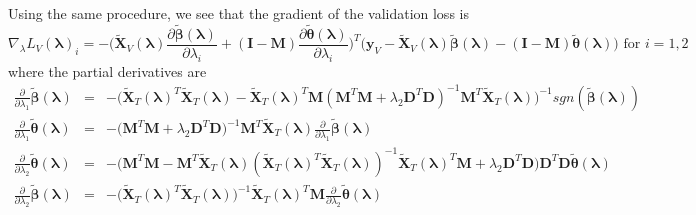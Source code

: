 \documentclass[10pt,letterpaper]{article}
\begin{document}
Using the same procedure, we see that the gradient of the validation loss is
\begin{equation*}
\nabla_\lambda L_V(\boldsymbol{\lambda})_i =
- \bigg(
\tilde{\boldsymbol{X}}_V(\boldsymbol{\lambda}) \frac{\partial \tilde{\boldsymbol\beta}(\boldsymbol{\lambda})}{\partial \lambda_i}
+ (\boldsymbol I - \boldsymbol{M}) \frac{\partial \tilde{\boldsymbol\theta}(\boldsymbol{\lambda})}{\partial \lambda_i}
\bigg )^T
\bigg (
\boldsymbol{y}_V
- \tilde{\boldsymbol{X}}_V(\boldsymbol{\lambda}) \tilde{\boldsymbol\beta}(\boldsymbol{\lambda})
- (\boldsymbol I - \boldsymbol{M}) \tilde{\boldsymbol\theta}(\boldsymbol{\lambda})
\bigg )
\text{ for } i = 1,2 
\end{equation*}
where the partial derivatives are
\begin{equation*}
\begin{array}{lcl}
\frac{\partial}{\partial \lambda_1} \tilde{\boldsymbol\beta}(\boldsymbol{\lambda})  &=&
-\bigg(\tilde{\boldsymbol X}_T(\boldsymbol{\lambda})^T \tilde{\boldsymbol X}_T(\boldsymbol{\lambda})
- \tilde{\boldsymbol X}_T(\boldsymbol{\lambda})^T \boldsymbol{M}(\boldsymbol{M}^T \boldsymbol{M}
+ \lambda_2 \boldsymbol{D}^T\boldsymbol{D})^{-1} \boldsymbol{M}^T \tilde{\boldsymbol X}_T(\boldsymbol{\lambda}) \bigg)^{-1} 
sgn( \tilde{\boldsymbol\beta}(\boldsymbol{\lambda})) \\
\frac{\partial }{\partial \lambda_1} \tilde{\boldsymbol\theta}(\boldsymbol{\lambda}) &=&
-\bigg(\boldsymbol{M}^T \boldsymbol{M}
+ \lambda_2 \boldsymbol{D}^T \boldsymbol{D}\bigg)^{-1}
\boldsymbol{M}^T \tilde{\boldsymbol X}_T(\boldsymbol{\lambda}) \frac{\partial}{\partial \lambda_1} \tilde{\boldsymbol\beta}(\boldsymbol{\lambda})
\\
\frac{\partial}{\partial \lambda_2}  \tilde{\boldsymbol\theta}(\boldsymbol{\lambda}) &=&
-\bigg(\boldsymbol{M}^T \boldsymbol{M}
- \boldsymbol{M}^T \tilde{\boldsymbol X}_T(\boldsymbol{\lambda}) (\tilde{\boldsymbol X}_T(\boldsymbol{\lambda})^T\tilde{\boldsymbol X}_T(\boldsymbol{\lambda}))^{-1} \tilde{\boldsymbol X}_T(\boldsymbol{\lambda})^T \boldsymbol{M} + \lambda_2 \boldsymbol{D}^T\boldsymbol{D} \bigg)
\boldsymbol{D}^T\boldsymbol{D} \tilde{\boldsymbol\theta}(\boldsymbol{\lambda})
\\
\frac{\partial}{\partial \lambda_2} \tilde{\boldsymbol\beta}(\boldsymbol{\lambda}) &=&
- \bigg( \tilde{\boldsymbol X}_T(\boldsymbol{\lambda})^T\tilde{\boldsymbol X}_T(\boldsymbol{\lambda})\bigg)^{-1}
\tilde{\boldsymbol X}_T(\boldsymbol{\lambda})^T \boldsymbol{M}
\frac{\partial}{\partial \lambda_2}  \tilde{\boldsymbol\theta}(\boldsymbol{\lambda})\\
\end{array}
\end{equation*}
\end{document}
